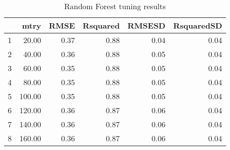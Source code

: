 \begin{table}[ht]
\centering
\begin{tabular}{rrrrrr}
  \hline
 & mtry & RMSE & Rsquared & RMSESD & RsquaredSD \\ 
  \hline
1 & 20.00 & 0.37 & 0.88 & 0.04 & 0.04 \\ 
  2 & 40.00 & 0.36 & 0.88 & 0.05 & 0.04 \\ 
  3 & 60.00 & 0.35 & 0.88 & 0.05 & 0.04 \\ 
  4 & 80.00 & 0.35 & 0.88 & 0.05 & 0.04 \\ 
  5 & 100.00 & 0.35 & 0.88 & 0.05 & 0.04 \\ 
  6 & 120.00 & 0.36 & 0.87 & 0.06 & 0.04 \\ 
  7 & 140.00 & 0.36 & 0.87 & 0.06 & 0.04 \\ 
  8 & 160.00 & 0.36 & 0.87 & 0.06 & 0.04 \\ 
   \hline
\end{tabular}
\caption{Random Forest tuning results} 
\label{tab:rfresults}
\end{table}

